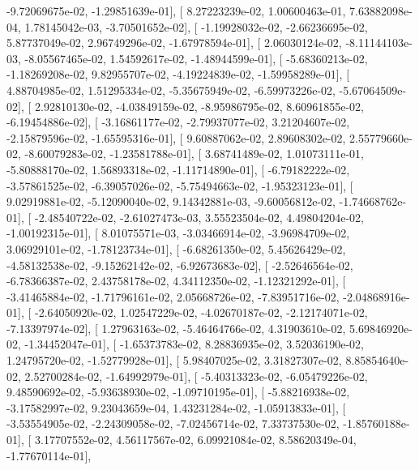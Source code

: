 \documentclass{article}
\begin{document}
         -9.72069675e-02,  -1.29851639e-01],
       [  8.27223239e-02,   1.00600463e-01,   7.63882098e-04,
          1.78145042e-03,  -3.70501652e-02],
       [ -1.19928032e-02,  -2.66236695e-02,   5.87737049e-02,
          2.96749296e-02,  -1.67978594e-01],
       [  2.06030124e-02,  -8.11144103e-03,  -8.05567465e-02,
          1.54592617e-02,  -1.48944599e-01],
       [ -5.68360213e-02,  -1.18269208e-02,   9.82955707e-02,
         -4.19224839e-02,  -1.59958289e-01],
       [  4.88704985e-02,   1.51295334e-02,  -5.35675949e-02,
         -6.59973226e-02,  -5.67064509e-02],
       [  2.92810130e-02,  -4.03849159e-02,  -8.95986795e-02,
          8.60961855e-02,  -6.19454886e-02],
       [ -3.16861177e-02,  -2.79937077e-02,   3.21204607e-02,
         -2.15879596e-02,  -1.65595316e-01],
       [  9.60887062e-02,   2.89608302e-02,   2.55779660e-02,
         -8.60079283e-02,  -1.23581788e-01],
       [  3.68741489e-02,   1.01073111e-01,  -5.80888170e-02,
          1.56893318e-02,  -1.11714890e-01],
       [ -6.79182222e-02,  -3.57861525e-02,  -6.39057026e-02,
         -5.75494663e-02,  -1.95323123e-01],
       [  9.02919881e-02,  -5.12090040e-02,   9.14342881e-03,
         -9.60056812e-02,  -1.74668762e-01],
       [ -2.48540722e-02,  -2.61027473e-03,   3.55523504e-02,
          4.49804204e-02,  -1.00192315e-01],
       [  8.01075571e-03,  -3.03466914e-02,  -3.96984709e-02,
          3.06929101e-02,  -1.78123734e-01],
       [ -6.68261350e-02,   5.45626429e-02,  -4.58132538e-02,
         -9.15262142e-02,  -6.92673683e-02],
       [ -2.52646564e-02,  -6.78366387e-02,   2.43758178e-02,
          4.34112350e-02,  -1.12321292e-01],
       [ -3.41465884e-02,  -1.71796161e-02,   2.05668726e-02,
         -7.83951716e-02,  -2.04868916e-01],
       [ -2.64050920e-02,   1.02547229e-02,  -4.02670187e-02,
         -2.12174071e-02,  -7.13397974e-02],
       [  1.27963163e-02,  -5.46464766e-02,   4.31903610e-02,
          5.69846920e-02,  -1.34452047e-01],
       [ -1.65373783e-02,   8.28836935e-02,   3.52036190e-02,
          1.24795720e-02,  -1.52779928e-01],
       [  5.98407025e-02,   3.31827307e-02,   8.85854640e-02,
          2.52700284e-02,  -1.64992979e-01],
       [ -5.40313323e-02,  -6.05479226e-02,   9.48590692e-02,
         -5.93638930e-02,  -1.09710195e-01],
       [ -5.88216938e-02,  -3.17582997e-02,   9.23043659e-04,
          1.43231284e-02,  -1.05913833e-01],
       [ -3.53554905e-02,  -2.24309058e-02,  -7.02456714e-02,
          7.33737530e-02,  -1.85760188e-01],
       [  3.17707552e-02,   4.56117567e-02,   6.09921084e-02,
          8.58620349e-04,  -1.77670114e-01],
\end{document}

